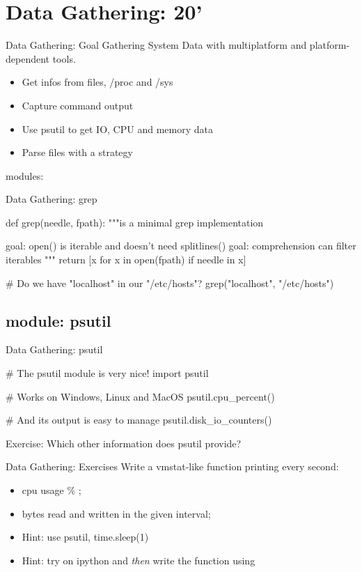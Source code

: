 \section{Data Gathering: 20'}
%
%


\begin{pyframe}{Data Gathering: Goal}
    Gathering System Data with multiplatform
     and platform-dependent tools.
\begin{itemize}
\item Get infos from files, /proc and /sys
\item Capture command output
\item Use psutil to get IO, CPU and memory data
\item Parse files with a strategy
\end{itemize}
modules: 
\end{pyframe}


\begin{pyframe}{Data Gathering: grep}
\begin{pycode}
def grep(needle, fpath):
    """is a minimal grep implementation

       goal: open() is iterable and doesn't
             need splitlines()
       goal: comprehension can filter iterables
    """
    return [x for x in open(fpath) if needle in x]

# Do we have "localhost" in our "/etc/hosts"?
grep("localhost", "/etc/hosts")
\end{pycode}
\end{pyframe}

\subsection{module: psutil}
\begin{pyframe}{Data Gathering: psutil}
\begin{pycode}
# The psutil module is very nice!
import psutil

# Works on Windows, Linux and MacOS
psutil.cpu_percent()

# And its output is easy to manage
psutil.disk_io_counters()

\end{pycode}
Exercise: Which other information does psutil provide?
\end{pyframe}


\begin{pyframe}{Data Gathering: Exercises}
Write a vmstat-like function printing every second:
\begin{itemize}
\item cpu usage \% ;
\item bytes read and written in the given interval;
\item Hint: use psutil, time.sleep(1)
\item Hint: try on ipython and \emph{then} write the function using \\\\
\end{itemize}
\end{pyframe}

